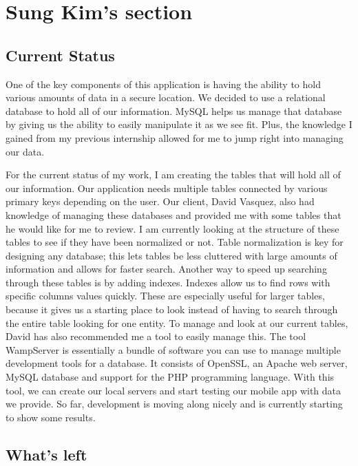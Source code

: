\documentclass[letterpaper, 10pt,titlepage]{article}
\begin{document}
\section{Sung Kim's section}
\subsection{Current Status}
One of the key components of this application is having the ability to hold various amounts of data in a secure location. We decided to use a relational database to hold all of our information. MySQL helps us manage that database by giving us the ability to easily manipulate it as we see fit. Plus, the knowledge I gained from my previous internship allowed for me to jump right into managing our data.

For the current status of my work, I am creating the tables that will hold all of our information. Our application needs multiple tables connected by various primary keys depending on the user. Our client, David Vasquez, also had knowledge of managing these databases and provided me with some tables that he would like for me to review. I am currently looking at the structure of these tables to see if they have been normalized or not. Table normalization is key for designing any database; this lets tables be less cluttered with large amounts of information and allows for faster search. Another way to speed up searching through these tables is by adding indexes. Indexes allow us to find rows with specific columns values quickly. These are especially useful for larger tables, because it gives us a starting place to look instead of having to search through the entire table looking for one entity. To manage and look at our current tables, David has also recommended me a tool to easily manage this. The tool WampServer is essentially a bundle of software you can use to manage multiple development tools for a database. It consists of OpenSSL, an Apache web server, MySQL database and support for the PHP programming language. With this tool, we can create our local servers and start testing our mobile app with data we provide. So far, development is moving along nicely and is currently starting to show some results.

\subsection{What's left}
\end{document}
